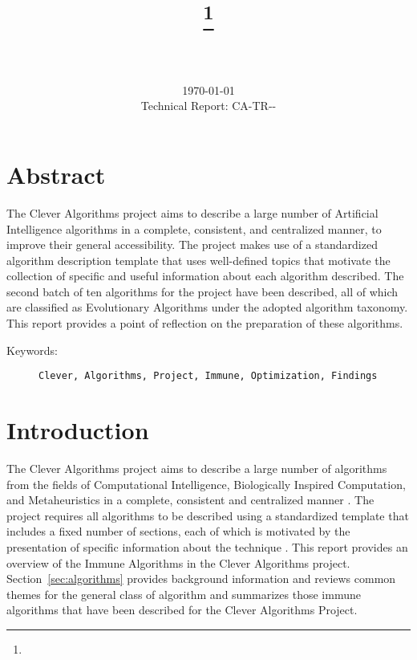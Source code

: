 \documentclass[a4paper, 11pt]{article}
\title{{\myreporttitle}\footnote{\myreportlicense}}
\author{\myreportauthor\\{\myreportemail}\\\small\myreportproject}
\date{\today\\{\small{Technical Report: CA-TR-{\myreportdate}-\myreportversion}}}
\begin{document}
\maketitle

\section*{Abstract} 
The Clever Algorithms project aims to describe a large number of Artificial Intelligence algorithms in a complete, consistent, and centralized manner, to improve their general accessibility. 
The project makes use of a standardized algorithm description template that uses well-defined topics that motivate the collection of specific and useful information about each algorithm described.
The second batch of ten algorithms for the project have been described, all of which are classified as Evolutionary Algorithms under the adopted algorithm taxonomy.
This report provides a point of reflection on the preparation of these algorithms.

\begin{description}
	\item[Keywords:] {\small\texttt{Clever, Algorithms, Project, Immune, Optimization, Findings}}
\end{description} 

\section{Introduction}
\label{sec:introduction}
The Clever Algorithms project aims to describe a large number of algorithms from the fields of Computational Intelligence, Biologically Inspired Computation, and Metaheuristics in a complete, consistent and centralized manner \cite{Brownlee2010}.
The project requires all algorithms to be described using a standardized template that includes a fixed number of sections, each of which is motivated by the presentation of specific information about the technique \cite{Brownlee2010a}.
This report provides an overview of the Immune Algorithms in the Clever Algorithms project. 
Section~\ref{sec:algorithms} provides background information and reviews common themes for the general class of algorithm and summarizes those immune algorithms that have been described for the Clever Algorithms Project.
\end{document}
